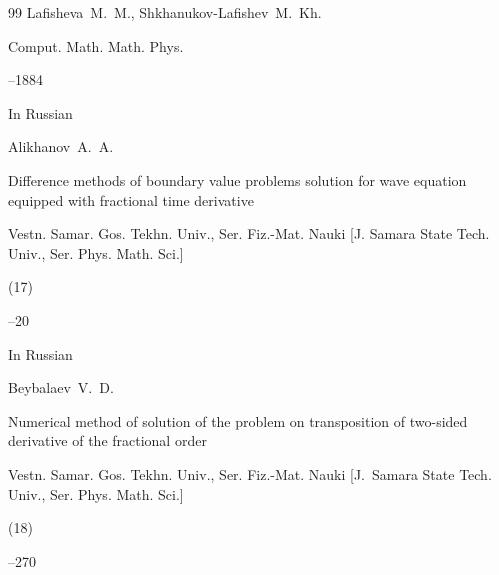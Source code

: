 \begin{thebibliography}{99}
\by  Lafisheva~M.~M., Shkhanukov-Lafishev~M.~Kh.



\jour Comput. Math. Math. Phys.




--1884







\lang In Russian

\by Alikhanov~A.~A.

\paper Difference methods of boundary value problems solution for wave equation equipped with fractional time derivative

\jour Vestn. Samar. Gos. Tekhn. Univ., Ser. Fiz.-Mat. Nauki \rm [J. Samara State Tech. Univ., Ser. Phys. Math. Sci.]


(17)

--20





\lang In Russian

\by Beybalaev~V.~D.

\paper Numerical method of solution of the problem on transposition of two-sided derivative of the fractional order

\jour Vestn. Samar. Gos. Tekhn. Univ., Ser. Fiz.-Mat. Nauki \rm [J.~Samara State Tech. Univ., Ser. Phys. Math. Sci.]


(18)

--270






\end{thebibliography}
